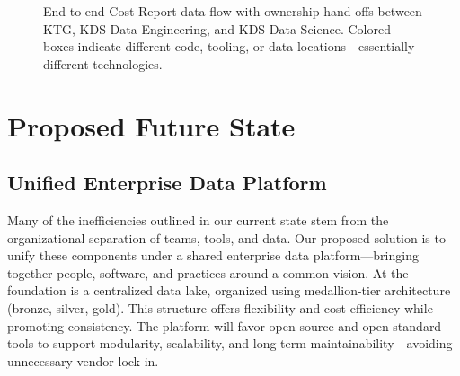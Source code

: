 \documentclass{article}
\begin{document}
\begin{figure}[H]
\begin{center}
{%
    }%
    \end{center}

    \caption{End-to-end Cost Report data flow with ownership hand-offs
        between KTG, KDS Data Engineering, and KDS Data Science. Colored boxes indicate different code, tooling, or data locations - essentially different technologies.}
    \label{fig:data-ownership-flow}
\end{figure}

\section{Proposed Future State}

\subsection{Unified Enterprise Data Platform}

Many of the inefficiencies outlined in our current state stem from the organizational separation of teams, tools, and data. Our proposed solution is to unify these components under a shared enterprise data platform—bringing together people, software, and practices around a common vision.
At the foundation is a centralized data lake, organized using medallion-tier architecture (bronze, silver, gold). This structure offers flexibility and cost-efficiency while promoting consistency. The platform will favor open-source and open-standard tools to support modularity, scalability, and long-term maintainability—avoiding unnecessary vendor lock-in.
\end{document}
